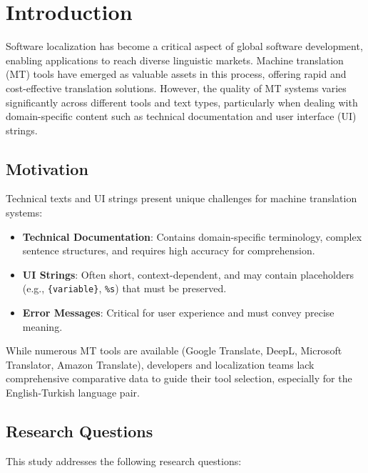 \section{Introduction}

Software localization has become a critical aspect of global software development, enabling applications to reach diverse linguistic markets. Machine translation (MT) tools have emerged as valuable assets in this process, offering rapid and cost-effective translation solutions. However, the quality of MT systems varies significantly across different tools and text types, particularly when dealing with domain-specific content such as technical documentation and user interface (UI) strings.

\subsection{Motivation}

Technical texts and UI strings present unique challenges for machine translation systems:

\begin{itemize}
    \item \textbf{Technical Documentation}: Contains domain-specific terminology, complex sentence structures, and requires high accuracy for comprehension.
    \item \textbf{UI Strings}: Often short, context-dependent, and may contain placeholders (e.g., \texttt{\{variable\}}, \texttt{\%s}) that must be preserved.
    \item \textbf{Error Messages}: Critical for user experience and must convey precise meaning.
\end{itemize}

While numerous MT tools are available (Google Translate, DeepL, Microsoft Translator, Amazon Translate), developers and localization teams lack comprehensive comparative data to guide their tool selection, especially for the English-Turkish language pair.

\subsection{Research Questions}

This study addresses the following research questions:

